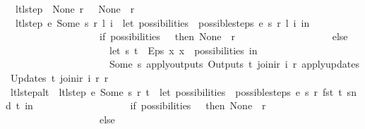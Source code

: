 \begin{isabellebody}
\ \ {\isachardoublequoteopen}ltl{\isacharunderscore}step\ {\isacharunderscore}\ None\ r\ {\isacharunderscore}\ {\isacharequal}\ {\isacharparenleft}None{\isacharcomma}\ {\isacharbrackleft}{\isacharbrackright}{\isacharcomma}\ r{\isacharparenright}{\isachardoublequoteclose}\ {\isacharbar}\isanewline
\ \ {\isachardoublequoteopen}ltl{\isacharunderscore}step\ e\ {\isacharparenleft}Some\ s{\isacharparenright}\ r\ {\isacharparenleft}l{\isacharcomma}\ i{\isacharparenright}\ {\isacharequal}\ {\isacharparenleft}let\ possibilities\ {\isacharequal}\ possible{\isacharunderscore}steps\ e\ s\ r\ l\ i\ in\isanewline
\ \ \ \ \ \ \ \ \ \ \ \ \ \ \ \ \ \ \ if\ possibilities\ {\isacharequal}\ {\isacharbraceleft}{\isacharbar}{\isacharbar}{\isacharbraceright}\ then\ {\isacharparenleft}None{\isacharcomma}\ {\isacharbrackleft}{\isacharbrackright}{\isacharcomma}\ r{\isacharparenright}\isanewline
\ \ \ \ \ \ \ \ \ \ \ \ \ \ \ \ \ \ \ else\isanewline
\ \ \ \ \ \ \ \ \ \ \ \ \ \ \ \ \ \ \ \ \ let\ {\isacharparenleft}s{\isacharprime}{\isacharcomma}\ t{\isacharparenright}\ {\isacharequal}\ Eps\ {\isacharparenleft}{\isasymlambda}x{\isachardot}\ x\ {\isacharbar}{\isasymin}{\isacharbar}\ possibilities{\isacharparenright}\ in\isanewline
\ \ \ \ \ \ \ \ \ \ \ \ \ \ \ \ \ \ \ \ \ {\isacharparenleft}Some\ s{\isacharprime}{\isacharcomma}\ {\isacharparenleft}apply{\isacharunderscore}outputs\ {\isacharparenleft}Outputs\ t{\isacharparenright}\ {\isacharparenleft}join{\isacharunderscore}ir\ i\ r{\isacharparenright}{\isacharparenright}{\isacharcomma}\ {\isacharparenleft}apply{\isacharunderscore}updates\ {\isacharparenleft}Updates\ t{\isacharparenright}\ {\isacharparenleft}join{\isacharunderscore}ir\ i\ r{\isacharparenright}\ r{\isacharparenright}{\isacharparenright}\isanewline
\ \ \ \ \ \ \ \ \ \ \ \ \ \ \ \ \ \ {\isacharparenright}{\isachardoublequoteclose}\isanewline
\isanewline
{}\isamarkupfalse%
\ ltl{\isacharunderscore}step{\isacharunderscore}alt{\isacharcolon}\ \ {\isachardoublequoteopen}ltl{\isacharunderscore}step\ e\ {\isacharparenleft}Some\ s{\isacharparenright}\ r\ t\ {\isacharequal}\ {\isacharparenleft}let\ possibilities\ {\isacharequal}\ possible{\isacharunderscore}steps\ e\ s\ r\ {\isacharparenleft}fst\ t{\isacharparenright}\ {\isacharparenleft}snd\ t{\isacharparenright}\ in\isanewline
\ \ \ \ \ \ \ \ \ \ \ \ \ \ \ \ \ \ \ if\ possibilities\ {\isacharequal}\ {\isacharbraceleft}{\isacharbar}{\isacharbar}{\isacharbraceright}\ then\ {\isacharparenleft}None{\isacharcomma}\ {\isacharbrackleft}{\isacharbrackright}{\isacharcomma}\ r{\isacharparenright}\isanewline
\ \ \ \ \ \ \ \ \ \ \ \ \ \ \ \ \ \ \ else\isanewline

\end{isabellebody}
